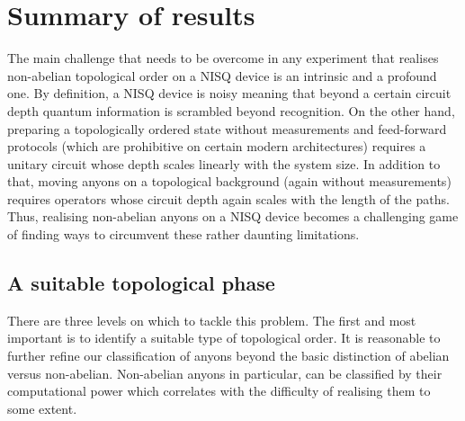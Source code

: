 \documentclass[a4paper,twocolumn,11pt]{quantumarticle}
\begin{document}
\section{Summary of results}\label{sec:summary_intro}
The main challenge that needs to be overcome in any experiment that realises non-abelian topological order on a NISQ device is an intrinsic and a profound one. By definition, a NISQ device is noisy meaning that beyond a certain circuit depth quantum information is scrambled beyond recognition. On the other hand, preparing a topologically ordered state without measurements and feed-forward protocols (which are prohibitive on certain modern architectures) requires a unitary circuit whose depth scales linearly with the system size. In addition to that, moving anyons on a topological background (again without measurements) requires operators whose circuit depth again scales with the length of the paths. Thus, realising non-abelian anyons on a NISQ device becomes a challenging game of finding ways to circumvent these rather daunting limitations. 

\subsection{A suitable topological phase}

There are three levels on which to tackle this problem. The first and most important is to identify a suitable type of topological order. It is reasonable to further refine our classification of anyons beyond the basic distinction of abelian versus non-abelian. Non-abelian anyons in particular, can be classified by their computational power which correlates with the difficulty of realising them to some extent. 
\end{document}
